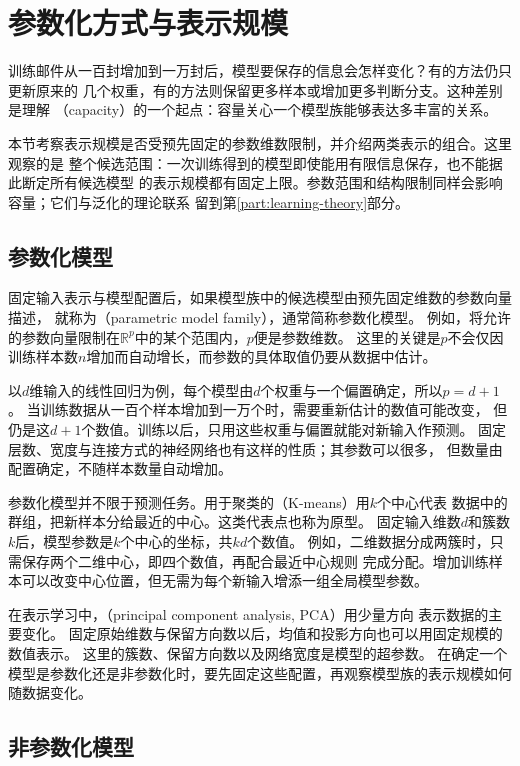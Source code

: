 \section{参数化方式与表示规模}
\label{sec:models-capacity}

训练邮件从一百封增加到一万封后，模型要保存的信息会怎样变化？有的方法仍只更新原来的
几个权重，有的方法则保留更多样本或增加更多判断分支。这种差别是理解
（capacity）的一个起点：容量关心一个模型族能够表达多丰富的关系。

本节考察表示规模是否受预先固定的参数维数限制，并介绍两类表示的组合。这里观察的是
整个候选范围：一次训练得到的模型即使能用有限信息保存，也不能据此断定所有候选模型
的表示规模都有固定上限。参数范围和结构限制同样会影响容量；它们与泛化的理论联系
留到第\ref{part:learning-theory}部分。

\subsection{参数化模型}
\label{sec:models-parametric}

固定输入表示与模型配置后，如果模型族中的候选模型由预先固定维数的参数向量描述，
就称为（parametric model family），通常简称参数化模型。
例如，将允许的参数向量限制在$\mathbb{R}^{p}$中的某个范围内，$p$便是参数维数。
这里的关键是$p$不会仅因训练样本数$n$增加而自动增长，而参数的具体取值仍要从数据中估计。

以$d$维输入的线性回归为例，每个模型由$d$个权重与一个偏置确定，所以$p=d+1$。
当训练数据从一百个样本增加到一万个时，需要重新估计的数值可能改变，
但仍是这$d+1$个数值。训练以后，只用这些权重与偏置就能对新输入作预测。
固定层数、宽度与连接方式的神经网络也有这样的性质；其参数可以很多，
但数量由配置确定，不随样本数量自动增加。

参数化模型并不限于预测任务。用于聚类的（K-means）用$k$个中心代表
数据中的群组，把新样本分给最近的中心。这类代表点也称为原型。
固定输入维数$d$和簇数$k$后，模型参数是$k$个中心的坐标，共$kd$个数值。
例如，二维数据分成两簇时，只需保存两个二维中心，即四个数值，再配合最近中心规则
完成分配。增加训练样本可以改变中心位置，但无需为每个新输入增添一组全局模型参数。

在表示学习中，（principal component analysis, PCA）用少量方向
表示数据的主要变化。
固定原始维数与保留方向数以后，均值和投影方向也可以用固定规模的数值表示。
这里的簇数、保留方向数以及网络宽度是模型的超参数。
在确定一个模型是参数化还是非参数化时，要先固定这些配置，再观察模型族的表示规模如何随数据变化。

\subsection{非参数化模型}
\label{sec:models-nonparametric}

